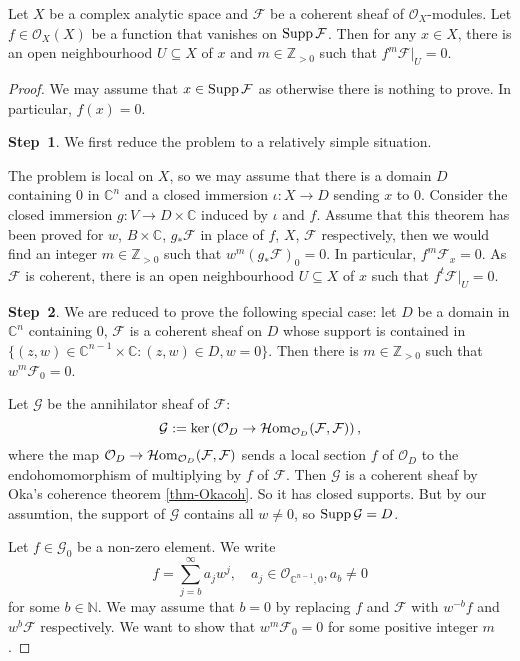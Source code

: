 \begin{thm}
    Let $X$ be a complex analytic space and $\mathcal{F}$ be a coherent sheaf of $\mathcal{O}_X$-modules. Let $f\in \mathcal{O}_X(X)$ be a function that vanishes on $\operatorname{Supp} \mathcal{F}$. Then for any $x\in X$, there is an open neighbourhood $U\subseteq X$ of $x$ and $m\in \mathbb{Z}_{>0}$ such that $f^m\mathcal{F}|_U=0$.
\end{thm}
\begin{proof}
    We may assume that $x\in \operatorname{Supp} \mathcal{F}$ as otherwise there is nothing to prove. In particular, $f(x)=0$.

    \textbf{Step~1}. We first reduce the problem to a relatively simple situation.

    The problem is local on $X$, so we may assume that there is a domain $D$ containing $0$ in $\mathbb{C}^n$ and a closed immersion $\iota:X\rightarrow D$ sending $x$ to $0$. Consider the closed immersion $g:V\rightarrow D\times \mathbb{C}$ induced by $\iota$ and $f$. Assume that this theorem has been proved for $w$, $B\times \mathbb{C}$, $g_*\mathcal{F}$ in place of $f$, $X$, $\mathcal{F}$ respectively, then we would find an integer $m\in \mathbb{Z}_{>0}$ such that $w^m(g_*\mathcal{F})_0=0$. In particular, $f^m\mathcal{F}_x=0$. As $\mathcal{F}$ is coherent, there is an open neighbourhood $U\subseteq X$ of $x$ such that $f^t\mathcal{F}|_U=0$.

    \textbf{Step~2}. We are reduced to prove the following special case: let $D$ be a domain in $\mathbb{C}^n$ containing $0$, $\mathcal{F}$ is a coherent sheaf on $D$ whose support is contained in $\{(z,w)\in \mathbb{C}^{n-1}\times \mathbb{C}:(z,w)\in D,w=0\}$. Then there is $m\in \mathbb{Z}_{>0}$ such that $w^m\mathcal{F}_0=0$.

    Let $\mathcal{G}$ be the annihilator sheaf of $\mathcal{F}$: 
    \[
       \mathcal{G}:=\ker \left(\mathcal{O}_D\rightarrow \operatorname{\mathcal{H}\mathrm{om}}_{\mathcal{O}_D}(\mathcal{F},\mathcal{F})\right),
    \]
    where the map $\mathcal{O}_D\rightarrow \operatorname{\mathcal{H}\mathrm{om}}_{\mathcal{O}_D}(\mathcal{F},\mathcal{F})$ sends a local section $f$ of $\mathcal{O}_D$ to the endohomomorphism of multiplying by $f$ of $\mathcal{F}$.
    Then $\mathcal{G}$ is a coherent sheaf by Oka's coherence theorem \cref{thm-Okacoh}. So it has closed supports. But by our assumtion, the support of $\mathcal{G}$ contains all $w\neq 0$, so $\operatorname{Supp} \mathcal{G}=D$.

    Let $f\in \mathcal{G}_0$ be a non-zero element. We write
    \[
      f=\sum_{j=b}^{\infty}a_jw^j,\quad a_j\in \mathcal{O}_{\mathbb{C}^{n-1},0},a_b\neq 0
    \]
    for some $b\in \mathbb{N}$.
    We may assume that $b=0$ by replacing $f$ and $\mathcal{F}$ with $w^{-b}f$ and  $w^b\mathcal{F}$ respectively. We want to show that $w^m\mathcal{F}_0=0$ for some positive integer $m$. 
    

\end{proof}
